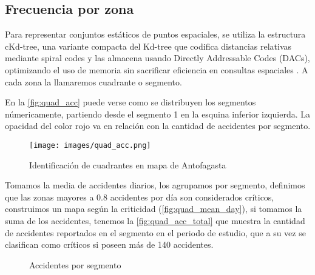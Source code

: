 \documentclass[12pt]{article}
\begin{document}

\subsection{Frecuencia por zona}

Para representar conjuntos estáticos de puntos espaciales, se utiliza la estructura cKd-tree, una variante compacta del Kd-tree que codifica distancias relativas mediante spiral codes y las almacena usando Directly Addressable Codes (DACs), optimizando el uso de memoria sin sacrificar eficiencia en consultas espaciales \parencite{gutierrez2023ckdtree}. A cada zona la llamaremos cuadrante o segmento.

En la \autoref{fig:quad_acc} puede verse como se distribuyen los segmentos númericamente, partiendo desde el segmento 1 en la esquina inferior izquierda. La opacidad del color rojo va en relación con la cantidad de accidentes por segmento.

\begin{figure}[H]
    \centering
    \texttt{[image: images/quad\_acc.png]}
    \caption{Identificación de cuadrantes en mapa de Antofagasta}
    \label{fig:quad_acc}
\end{figure}

Tomamos la media de accidentes diarios, los agrupamos por segmento, definimos que las zonas mayores a 0.8 accidentes por día son considerados críticos, construimos un mapa según la criticidad (\autoref{fig:quad_mean_day}), si tomamos la suma de los accidentes, tenemos la \autoref{fig:quad_acc_total} que muestra la cantidad de accidentes reportados en el segmento en el periodo de estudio, que a su vez se clasifican como críticos si poseen más de 140 accidentes.


\begin{figure}[H]
    \centering
    \caption{Accidentes por segmento}
\end{figure}




\end{document}
